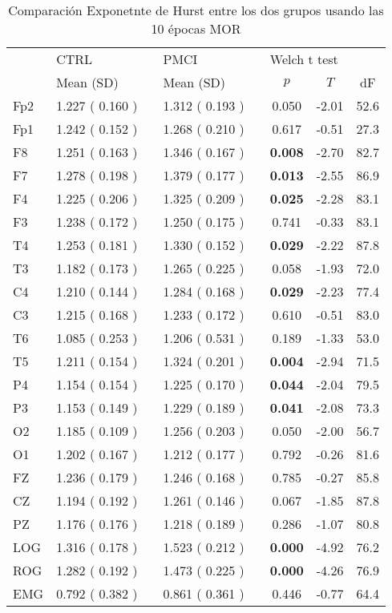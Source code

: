 \documentclass[10pt,a4paper]{article}
\begin{document}
\begin{table}
\centering
\caption{Comparación Exponetnte de Hurst entre los dos grupos usando las 10 épocas MOR}
\begin{tabular}{llclcccc}
\toprule
 & \multicolumn{1}{l}{CTRL} & \phantom{.} & \multicolumn{1}{l}{PMCI} & \phantom{.} &
 \multicolumn{3}{l}{Welch t test} \\
\cmidrule{2-2} \cmidrule{4-4} \cmidrule{6-8}
& Mean (SD) & & Mean (SD) & & $p$ & $T$ & dF \\
\midrule
Fp2 &	1.227	(	0.160	) & &	1.312	(	0.193	) & &	0.050 &	-2.01 &	52.6 \\
Fp1 &	1.242	(	0.152	) & &	1.268	(	0.210	) & &	0.617 &	-0.51 &	27.3 \\
F8 &	1.251	(	0.163	) & &	1.346	(	0.167	) & &\bf	0.008 &	-2.70 &	82.7 \\
F7 &	1.278	(	0.198	) & &	1.379	(	0.177	) & &\bf	0.013 &	-2.55 &	86.9 \\
F4 &	1.225	(	0.206	) & &	1.325	(	0.209	) & &\bf	0.025 &	-2.28 &	83.1 \\
F3 &	1.238	(	0.172	) & &	1.250	(	0.175	) & &	0.741 &	-0.33 &	83.1 \\
T4 &	1.253	(	0.181	) & &	1.330	(	0.152	) & &\bf	0.029 &	-2.22 &	87.8 \\
T3 &	1.182	(	0.173	) & &	1.265	(	0.225	) & &	0.058 &	-1.93 &	72.0 \\
C4 &	1.210	(	0.144	) & &	1.284	(	0.168	) & &\bf	0.029 &	-2.23 &	77.4 \\
C3 &	1.215	(	0.168	) & &	1.233	(	0.172	) & &	0.610 &	-0.51 &	83.0 \\
T6 &	1.085	(	0.253	) & &	1.206	(	0.531	) & &	0.189 &	-1.33 &	53.0 \\
T5 &	1.211	(	0.154	) & &	1.324	(	0.201	) & &\bf	0.004 &	-2.94 &	71.5 \\
P4 &	1.154	(	0.154	) & &	1.225	(	0.170	) & &\bf	0.044 &	-2.04 &	79.5 \\
P3 &	1.153	(	0.149	) & &	1.229	(	0.189	) & &\bf	0.041 &	-2.08 &	73.3 \\
O2 &	1.185	(	0.109	) & &	1.256	(	0.203	) & &	0.050 &	-2.00 &	56.7 \\
O1 &	1.202	(	0.167	) & &	1.212	(	0.177	) & &	0.792 &	-0.26 &	81.6 \\
FZ &	1.236	(	0.179	) & &	1.246	(	0.168	) & &	0.785 &	-0.27 &	85.8 \\
CZ &	1.194	(	0.192	) & &	1.261	(	0.146	) & &	0.067 &	-1.85 &	87.8 \\
PZ &	1.176	(	0.176	) & &	1.218	(	0.189	) & &	0.286 &	-1.07 &	80.8 \\
LOG &	1.316	(	0.178	) & &	1.523	(	0.212	) & &\bf	0.000 &	-4.92 &	76.2 \\
ROG	&   1.282	(	0.192	) & &	1.473	(	0.225	) & &\bf	0.000 &	-4.26 &	76.9 \\
EMG &   0.792	(	0.382	) & &	0.861	(	0.361	) & &	0.446 &	-0.77 &	64.4 \\
\bottomrule
\end{tabular}
\end{table}
\end{document}
